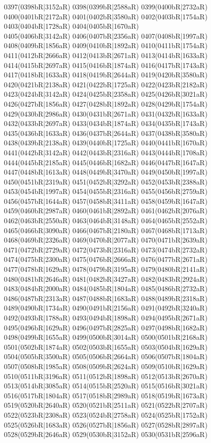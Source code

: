 0397(0398bR|3152aR) 0398(0399bR|2588aR) 0399(0400bR|2732aR) 0400(0401bR|2172aR) 0401(0402bR|3580aR) 0402(0403bR|1754aR) 0403(0404bR|1728aR) 0404(0405bR|1670aR) \\0405(0406bR|3142aR) 0406(0407bR|2356aR) 0407(0408bR|1997aR) 0408(0409bR|1856aR) 0409(0410bR|1892aR) 0410(0411bR|1754aR) 0411(0412bR|2666aR) 0412(0413bR|2671aR) 0413(0414bR|1633aR) \\0414(0415bR|2697aR) 0415(0416bR|1874aR) 0416(0417bR|1743aR) 0417(0418bR|1633aR) 0418(0419bR|2644aR) 0419(0420bR|3580aR) 0420(0421bR|2138aR) 0421(0422bR|1725aR) 0422(0423bR|2182aR) \\0423(0424bR|3142aR) 0424(0425bR|2358aR) 0425(0426bR|3021aR) 0426(0427bR|1856aR) 0427(0428bR|1892aR) 0428(0429bR|1754aR) 0429(0430bR|2986aR) 0430(0431bR|2671aR) 0431(0432bR|1633aR) \\0432(0433bR|2697aR) 0433(0434bR|1874aR) 0434(0435bR|1743aR) 0435(0436bR|1633aR) 0436(0437bR|2644aR) 0437(0438bR|3580aR) 0438(0439bR|2138aR) 0439(0440bR|1725aR) 0440(0441bR|1670aR) \\0441(0442bR|3142aR) 0442(0443bR|2316aR) 0443(0444bR|1708aR) 0444(0445bR|2185aR) 0445(0446bR|1682aR) 0446(0447bR|1647aR) 0447(0448bR|1613aR) 0448(0449bR|3470aR) 0449(0450bR|1997aR) \\0450(0451bR|2319aR) 0451(0452bR|3292aR) 0452(0453bR|2388aR) 0453(0454bR|1997aR) 0454(0455bR|2316aR) 0455(0456bR|2759aR) 0456(0457bR|1644aR) 0457(0458bR|3411aR) 0458(0459bR|1647aR) \\0459(0460bR|2987aR) 0460(0461bR|2892aR) 0461(0462bR|2076aR) 0462(0463bR|2550aR) 0463(0464bR|3148aR) 0464(0465bR|2552aR) 0465(0466bR|3090aR) 0466(0467bR|2180aR) 0467(0468bR|1713aR) \\0468(0469bR|2326aR) 0469(0470bR|2077aR) 0470(0471bR|2639aR) 0471(0472bR|2729aR) 0472(0473bR|2316aR) 0473(0474bR|2732aR) 0474(0475bR|2300aR) 0475(0476bR|2666aR) 0476(0477bR|2671aR) \\0477(0478bR|1629aR) 0478(0479bR|3195aR) 0479(0480bR|2141aR) 0480(0481bR|2646aR) 0481(0482bR|3427aR) 0482(0483bR|2924aR) 0483(0484bR|2000aR) 0484(0485bR|1804aR) 0485(0486bR|2732aR) \\0486(0487bR|2313aR) 0487(0488bR|1683aR) 0488(0489bR|2318aR) 0489(0490bR|1734aR) 0490(0491bR|2156aR) 0491(0492bR|3240aR) 0492(0493bR|1788aR) 0493(0494bR|1898aR) 0494(0495bR|2671aR) \\0495(0496bR|1629aR) 0496(0497bR|2825aR) 0497(0498bR|1682aR) 0498(0499bR|1655aR) 0499(0500bR|3014aR) 0500(0501bR|2168aR) 0501(0502bR|1874aR) 0502(0503bR|1655aR) 0503(0504bR|1629aR) \\0504(0505bR|3500aR) 0505(0506bR|2664aR) 0506(0507bR|1804aR) 0507(0508bR|1985aR) 0508(0509bR|2624aR) 0509(0510bR|1629aR) 0510(0511bR|3196aR) 0511(0512bR|1898aR) 0512(0513bR|2670aR) \\0513(0514bR|3085aR) 0514(0515bR|2520aR) 0515(0516bR|3021aR) 0516(0517bR|1804aR) 0517(0518bR|2989aR) 0518(0519bR|1673aR) 0519(0520bR|2640aR) 0520(0521bR|2511aR) 0521(0522bR|2707aR) \\0522(0523bR|2308aR) 0523(0524bR|2758aR) 0524(0525bR|1752aR) 0525(0526bR|1683aR) 0526(0527bR|1856aR) 0527(0528bR|2897aR) 0528(0529bR|2646aR) 0529(0530bR|3152aR) 0530(0531bR|2596aR) 